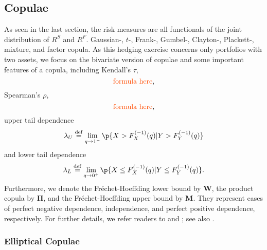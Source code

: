 
\subsection{Copulae}\label{subsec:copulae}
As seen in the last section, the risk measures are all
functionals of the joint distribution of $R^S$ and $R^F$.
 Gaussian-, $t$-, Frank-,
Gumbel-, Clayton-, Plackett-, mixture, and factor copula. 
As this hedging exercise concerns only portfolios with two assets, we
focus on the bivariate version of copulae and some important
features of a copula, including Kendall's $\tau$,
\begin{equation*}
  \text{\natp{formula here}},
\end{equation*}
Spearman's $\rho$,
\begin{equation*}
  \text{\natp{formula here}},
\end{equation*}
upper tail dependence
\begin{equation*}
\lambda_U \overset{\mathrm{def}}{=}  \lim_{q
  \rightarrow 1^-} \p\{X > F_{X}^{(-1)}(q)|Y > F_{Y}^{(-1)}(q)\}
\end{equation*}
and
lower tail dependence
\begin{equation*}
\lambda_L \overset{\mathrm{def}}{=}  \lim_{q
  \rightarrow 0^+} \p\{X \leq F_{X}^{(-1)}(q)|Y \leq
F_{Y}^{(-1)}(q)\}. 
\end{equation*}
Furthermore, we denote the Fr{\'e}chet-Hoeffding lower bound by
$\bm{W}$, the product copula by $\bm{\Pi}$, and the Fr{\'e}chet-Hoeffding
upper bound by $\bm{M}$. They represent cases of perfect negative
dependence, independence, and perfect positive dependence,
respectively. 
For further details, we refer readers to \citet{joe1997multivariate}
and \citet{Nelsen1999}; see also \citet{hardle2010copulis}.

\subsubsection{Elliptical Copulae}\label{sec:ellpitical-copulae}


